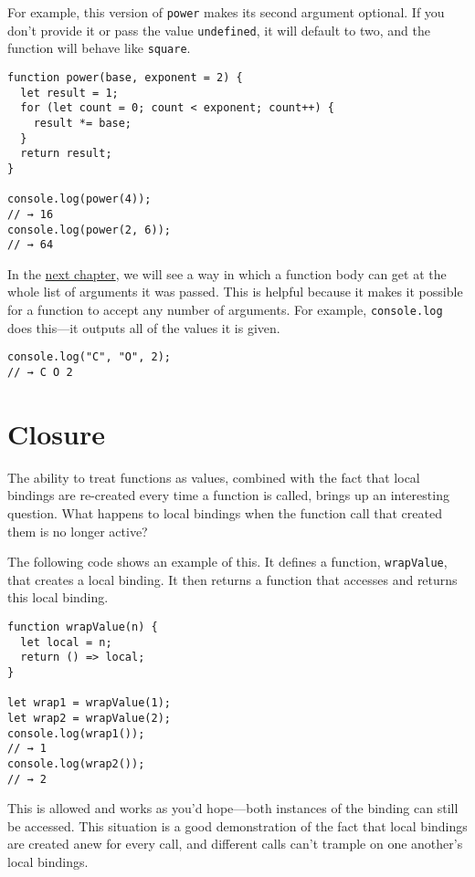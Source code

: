 For example, this version of \lstinline`power` makes its second argument optional. If you don't provide it or pass the value \lstinline`undefined`, it will default to two, and the function will behave like \lstinline`square`.

\begin{lstlisting}
function power(base, exponent = 2) {
  let result = 1;
  for (let count = 0; count < exponent; count++) {
    result *= base;
  }
  return result;
}

console.log(power(4));
// → 16
console.log(power(2, 6));
// → 64
\end{lstlisting}
\noindent{}

In the \hyperref[data.rest_parameters]{next chapter}, we will see a way in which a function body can get at the whole list of arguments it was passed. This is helpful because it makes it possible for a function to accept any number of arguments. For example, \lstinline`console.log` does this—it outputs all of the values it is given.

\begin{lstlisting}
console.log("C", "O", 2);
// → C O 2
\end{lstlisting}
\noindent

\section{Closure}

The ability to treat functions as values, combined with the fact that local bindings are re-created every time a function is called, brings up an interesting question. What happens to local bindings when the function call that created them is no longer active?

The following code shows an example of this. It defines a function, \lstinline`wrapValue`, that creates a local binding. It then returns a function that accesses and returns this local binding.

\begin{lstlisting}
function wrapValue(n) {
  let local = n;
  return () => local;
}

let wrap1 = wrapValue(1);
let wrap2 = wrapValue(2);
console.log(wrap1());
// → 1
console.log(wrap2());
// → 2
\end{lstlisting}
\noindent

This is allowed and works as you'd hope—both instances of the binding can still be accessed. This situation is a good demonstration of the fact that local bindings are created anew for every call, and different calls can't trample on one another's local bindings.

